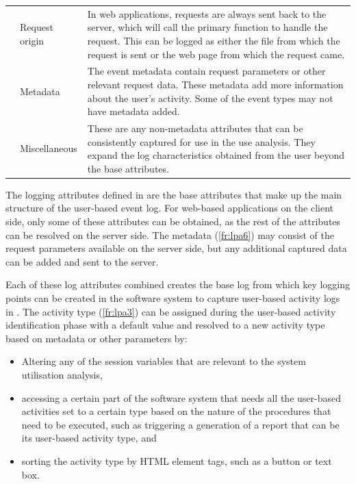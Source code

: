\begin{xltabular}{\textwidth}{llX}
     & Request origin & In web applications, requests are always sent back to the server, which will call the primary function to handle the request. This can be logged as either the file from which the request is sent or the web page from which the request came. \\ 

	 & Metadata & The event metadata contain request parameters or other relevant request data. These metadata add more information about the user's activity. Some of the event types may not have metadata added. \\

     & Miscellaneous & These are any non-metadata attributes that can be consistently captured for use in the use analysis. They expand the log characteristics obtained from the user beyond the base attributes. \\ 
    \bottomrule
\end{xltabular}

The logging attributes defined in  are the base attributes that make up the main structure of the user-based event log. For web-based applications on the client side, only some of these attributes can be obtained, as the rest of the attributes can be resolved on the server side. The metadata (\ref{fr:lpa6}) may consist of the request parameters available on the server side, but any additional captured data can be added and sent to the server. \par Each of these log attributes combined creates the base log from which key logging points can be created in the software system to capture user-based activity logs in . The activity type (\ref{fr:lpa3}) can be assigned during the user-based activity identification phase with a default value and resolved to a new activity type based on metadata or other parameters by:

\begin{itemize}
	\item Altering any of the session variables that are relevant to the system utilisation analysis,
	\item accessing a certain part of the software system that needs all the user-based activities set to a certain type based on the nature of the procedures that need to be executed, such as triggering a generation of a report that can be its user-based activity type, and
	\item sorting the activity type by HTML element tags, such as a button or text box.
\end{itemize}

